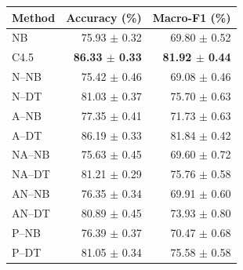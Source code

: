 \begin{tabular}{lrr}
\toprule
Method & Accuracy (\%) & Macro-F1 (\%) \\
\midrule
NB & 75.93 $\pm$ 0.32 & 69.80 $\pm$ 0.52 \\
C4.5 & \textbf{86.33 $\pm$ 0.33} & \textbf{81.92 $\pm$ 0.44} \\
N--NB & 75.42 $\pm$ 0.46 & 69.08 $\pm$ 0.46 \\
N--DT & 81.03 $\pm$ 0.37 & 75.70 $\pm$ 0.63 \\
A--NB & 77.35 $\pm$ 0.41 & 71.73 $\pm$ 0.63 \\
A--DT & 86.19 $\pm$ 0.33 & 81.84 $\pm$ 0.42 \\
NA--NB & 75.63 $\pm$ 0.45 & 69.60 $\pm$ 0.72 \\
NA--DT & 81.21 $\pm$ 0.29 & 75.76 $\pm$ 0.58 \\
AN--NB & 76.35 $\pm$ 0.34 & 69.91 $\pm$ 0.60 \\
AN--DT & 80.89 $\pm$ 0.45 & 73.93 $\pm$ 0.80 \\
P--NB & 76.39 $\pm$ 0.37 & 70.47 $\pm$ 0.68 \\
P--DT & 81.05 $\pm$ 0.34 & 75.58 $\pm$ 0.58 \\
\bottomrule
\end{tabular}
